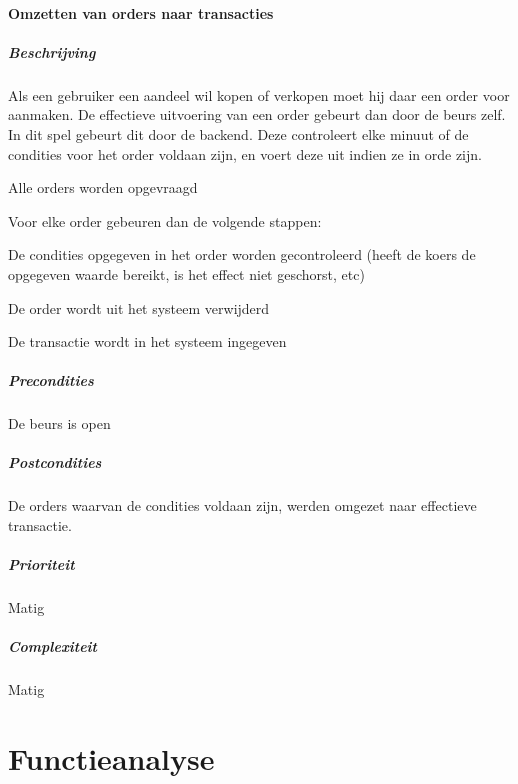 \paragraph{Omzetten van orders naar transacties}
\begin{compact}
\subparagraph{Beschrijving} Als een gebruiker een aandeel wil kopen of verkopen moet hij daar een order voor aanmaken. De effectieve uitvoering van een order gebeurt dan door de beurs zelf. In dit spel gebeurt dit door de backend. Deze controleert elke minuut of de condities voor het order voldaan zijn, en voert deze uit indien ze in orde zijn.
\begin{itemize_compact}
	\item Alle orders worden opgevraagd
  \item Voor elke order gebeuren dan de volgende stappen:
	\begin{itemize_compact}
		\item De condities opgegeven in het order worden gecontroleerd (heeft de koers de opgegeven waarde bereikt, is het effect niet geschorst, etc)
		\item De order wordt uit het systeem verwijderd
		\item De transactie wordt in het systeem ingegeven
	\end{itemize_compact}
\end{itemize_compact}
\subparagraph{Precondities} De beurs is open 
\subparagraph{Postcondities} De orders waarvan de condities voldaan zijn, werden omgezet naar effectieve transactie.
\subparagraph{Prioriteit}Matig
\subparagraph{Complexiteit}Matig
\end{compact}


%
%

\section{Functieanalyse}

